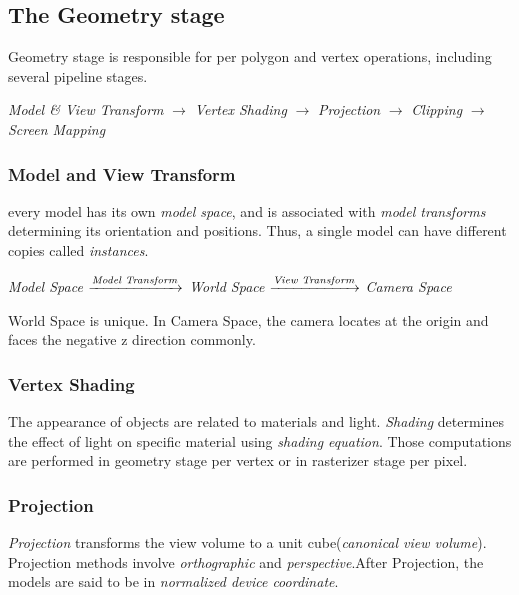 \documentclass[10pt, a4paper]{article}
\begin{document}
        \subsection{The Geometry stage} 
        Geometry stage is responsible for per polygon and vertex operations, including several pipeline stages.\\
        \begin{center}
        \emph{\scriptsize  Model \& View Transform} $\to$ \emph{\scriptsize Vertex Shading} $\to$ \emph{\scriptsize Projection} $\to$ \emph{\scriptsize Clipping} $\to$ \emph{\scriptsize Screen Mapping}
        \end{center}
            
            \subsubsection{Model and View Transform}
            every model has its own \emph{model space}, and is associated with \emph{model transforms} determining its orientation and positions. Thus, a single model can have different copies called \emph{instances}.\\
            \begin{center}
            \noindent \emph{\footnotesize Model Space} $\xrightarrow{\tiny \emph{Model Transform}}$ \emph{\footnotesize World Space} $\xrightarrow{\tiny \emph{View Transform}}$ \emph{\footnotesize Camera Space}
            \end{center}
            \newpage
            World Space is unique. In Camera Space, the camera locates at the origin and faces the negative z direction commonly.
            
            \subsubsection{Vertex Shading}
                The appearance of objects are related to materials and light. \emph{Shading} determines the effect of light on specific material using \emph{shading equation}. Those computations are performed in geometry stage per vertex or in rasterizer stage per pixel.
            
            \subsubsection{Projection}
                \emph{Projection} transforms the view volume to a unit cube(\emph{canonical view volume}). Projection methods involve \emph{orthographic} and \emph{perspective}.After Projection, the models are said to be in \emph{normalized device coordinate}.
            
\end{document}
